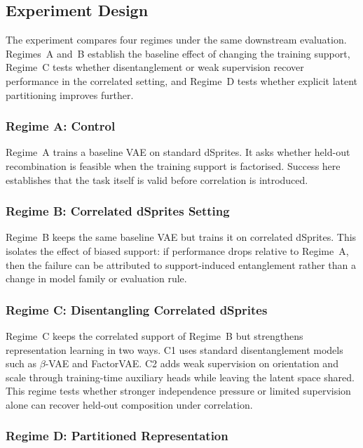 \subsection{Experiment Design}
\label{subsec:p2_models}

The experiment compares four regimes under the same downstream evaluation. Regimes~A and~B establish the baseline effect of changing the training support, Regime~C tests whether disentanglement or weak supervision recover performance in the correlated setting, and Regime~D tests whether explicit latent partitioning improves further.

\subsubsection{Regime A: Control}

Regime~A trains a baseline VAE on standard dSprites. It asks whether held-out recombination is feasible when the training support is factorised. Success here establishes that the task itself is valid before correlation is introduced.

\subsubsection{Regime B:  Correlated dSprites Setting}

Regime~B keeps the same baseline VAE but trains it on correlated dSprites. This isolates the effect of biased support: if performance drops relative to Regime~A, then the failure can be attributed to support-induced entanglement rather than a change in model family or evaluation rule.

\subsubsection{Regime C: Disentangling Correlated dSprites}
Regime~C keeps the correlated support of Regime~B but strengthens representation learning in two ways. C1 uses standard disentanglement models such as $\beta$-VAE and FactorVAE. C2 adds weak supervision on orientation and scale through training-time auxiliary heads while leaving the latent space shared. This regime tests whether stronger independence pressure or limited supervision alone can recover held-out composition under correlation.

\subsubsection{Regime D: Partitioned Representation}
\label{subsec:p2_spvae}

